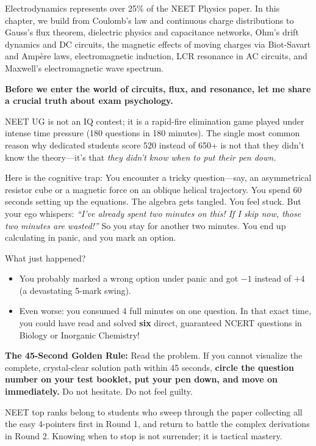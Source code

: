 \documentclass[10pt,twoside,openright]{book}
\begin{document}
Electrodynamics represents over 25\% of the NEET Physics paper. In this chapter, we build from Coulomb's law and continuous charge distributions to Gauss's flux theorem, dielectric physics and capacitance networks, Ohm's drift dynamics and DC circuits, the magnetic effects of moving charges via Biot-Savart and Ampère laws, electromagnetic induction, LCR resonance in AC circuits, and Maxwell's electromagnetic wave spectrum.

\begin{mentorbox}
\textbf{Before we enter the world of circuits, flux, and resonance, let me share a crucial truth about exam psychology.}

NEET UG is not an IQ contest; it is a rapid-fire elimination game played under intense time pressure (180 questions in 180 minutes). The single most common reason why dedicated students score 520 instead of 650+ is not that they didn't know the theory---it's that \textit{they didn't know when to put their pen down.}

Here is the cognitive trap: You encounter a tricky question---say, an asymmetrical resistor cube or a magnetic force on an oblique helical trajectory. You spend 60 seconds setting up the equations. The algebra gets tangled. You feel stuck. But your ego whispers: \textit{``I've already spent two minutes on this! If I skip now, those two minutes are wasted!''} So you stay for another two minutes. You end up calculating in panic, and you mark an option. 

What just happened?
\begin{itemize}[leftmargin=*]
  \item You probably marked a wrong option under panic and got $-1$ instead of $+4$ (a devastating 5-mark swing).
  \item Even worse: you consumed 4 full minutes on one question. In that exact time, you could have read and solved \textbf{six} direct, guaranteed NCERT questions in Biology or Inorganic Chemistry!
\end{itemize}

\textbf{The 45-Second Golden Rule:}
Read the problem. If you cannot visualize the complete, crystal-clear solution path within 45 seconds, \textbf{circle the question number on your test booklet, put your pen down, and move on immediately.} Do not hesitate. Do not feel guilty. 

NEET top ranks belong to students who sweep through the paper collecting all the easy 4-pointers first in Round 1, and return to battle the complex derivations in Round 2. Knowing when to stop is not surrender; it is tactical mastery.
\end{mentorbox}
\end{document}
